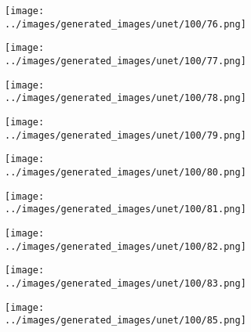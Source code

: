 \begin{figure}[H]
\hspace{1em}%
\begin{subfigure}[b]{0.1\textwidth}
\centering
\texttt{[image: ../images/generated\_images/unet/100/76.png]}
\end{subfigure}
\hspace{1em}%
\begin{subfigure}[b]{0.1\textwidth}
\centering
\texttt{[image: ../images/generated\_images/unet/100/77.png]}
\end{subfigure}
\hspace{1em}%
\begin{subfigure}[b]{0.1\textwidth}
\centering
\texttt{[image: ../images/generated\_images/unet/100/78.png]}
\end{subfigure}
\hspace{1em}%
\begin{subfigure}[b]{0.1\textwidth}
\centering
\texttt{[image: ../images/generated\_images/unet/100/79.png]}
\end{subfigure}
\hspace{1em}%
\begin{subfigure}[b]{0.1\textwidth}
\centering
\texttt{[image: ../images/generated\_images/unet/100/80.png]}
\end{subfigure}
\hspace{1em}%
\begin{subfigure}[b]{0.1\textwidth}
\centering
\texttt{[image: ../images/generated\_images/unet/100/81.png]}
\end{subfigure}
\hspace{1em}%
\begin{subfigure}[b]{0.1\textwidth}
\centering
\texttt{[image: ../images/generated\_images/unet/100/82.png]}
\end{subfigure}
\hspace{1em}%
\begin{subfigure}[b]{0.1\textwidth}
\centering
\texttt{[image: ../images/generated\_images/unet/100/83.png]}
\end{subfigure}
\hspace{1em}%
\begin{subfigure}[b]{0.1\textwidth}
\centering
\texttt{[image: ../images/generated\_images/unet/100/85.png]}
\end{subfigure}
\hspace{1em}%
\begin{subfigure}[b]{0.1\textwidth}

\end{subfigure}
\end{figure}
